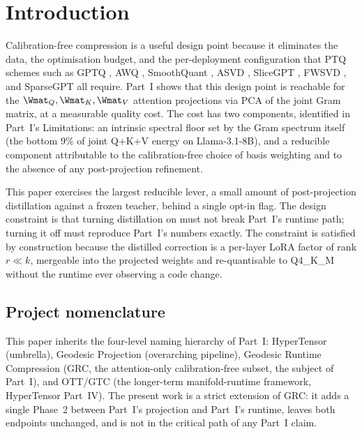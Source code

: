 \documentclass[11pt]{article}
\begin{document}
\section{Introduction}
\label{sec:intro}

Calibration-free compression is a useful design point because it
eliminates the data, the optimisation budget, and the per-deployment
configuration that PTQ schemes such as
GPTQ \cite{frantar2022gptq}, AWQ \cite{lin2023awq},
SmoothQuant \cite{xiao2022smoothquant}, ASVD \cite{yuan2023asvd},
SliceGPT \cite{ashkboos2024slicegpt}, FWSVD \cite{hsu2022fwsvd}, and
SparseGPT \cite{frantar2023sparsegpt} all require. Part~I shows
that this design point is reachable for the $\Wmat_Q,\Wmat_K,\Wmat_V$
attention projections via PCA of the joint Gram matrix, at a measurable
quality cost. The cost has two components, identified in Part~I's
Limitations: an intrinsic spectral floor set by the Gram spectrum
itself (the bottom $9\%$ of joint Q+K+V energy on Llama-3.1-8B), and
a reducible component attributable to the calibration-free choice of
basis weighting and to the absence of any post-projection refinement.

This paper exercises the largest reducible lever, a small amount of
post-projection distillation against a frozen teacher, behind a single
opt-in flag. The design constraint is that turning distillation on must
not break Part~I's runtime path; turning it off must reproduce
Part~I's numbers exactly. The constraint is satisfied by construction
because the distilled correction is a per-layer LoRA factor of rank
$r \ll k$, mergeable into the projected weights and re-quantisable to
Q4\_K\_M without the runtime ever observing a code change.

\subsection{Project nomenclature}
This paper inherits the four-level naming hierarchy of Part~I:
HyperTensor (umbrella), Geodesic Projection (overarching pipeline),
Geodesic Runtime Compression (GRC, the attention-only calibration-free
subset, the subject of Part~I), and OTT/GTC (the longer-term
manifold-runtime framework, HyperTensor Part~IV). The present work is a strict
extension of GRC: it adds a single Phase~2 between Part~I's projection
and Part~I's runtime, leaves both endpoints unchanged, and is not in
the critical path of any Part~I claim.
\end{document}
